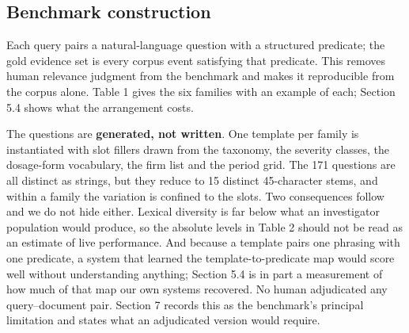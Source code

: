 \documentclass[acmsmall]{acmart}
\begin{document}
\subsection{Benchmark construction}
Each query pairs a natural-language question with a structured predicate; the gold evidence set is every corpus event satisfying that predicate. This removes human relevance judgment from the benchmark and makes it reproducible from the corpus alone. Table 1 gives the six families with an example of each; Section 5.4 shows what the arrangement costs.

The questions are \textbf{generated, not written}. One template per family is instantiated with slot fillers drawn from the taxonomy, the severity classes, the dosage-form vocabulary, the firm list and the period grid. The 171 questions are all distinct as strings, but they reduce to 15 distinct 45-character stems, and within a family the variation is confined to the slots. Two consequences follow and we do not hide either. Lexical diversity is far below what an investigator population would produce, so the absolute levels in Table 2 should not be read as an estimate of live performance. And because a template pairs one phrasing with one predicate, a system that learned the template-to-predicate map would score well without understanding anything; Section 5.4 is in part a measurement of how much of that map our own systems recovered. No human adjudicated any query--document pair. Section 7 records this as the benchmark's principal limitation and states what an adjudicated version would require.
\end{document}
